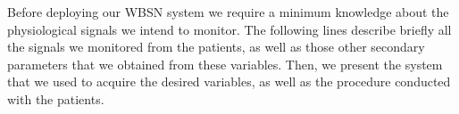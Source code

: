 
\label{chapter:setup}
Before deploying our WBSN system we require a minimum knowledge about
the physiological signals we intend to monitor. The following lines
describe briefly all the signals we monitored from the patients, as
well as those other secondary parameters that we obtained from these
variables. Then, we present the system that we used to acquire the
desired variables, as well as the procedure conducted with the
patients.
